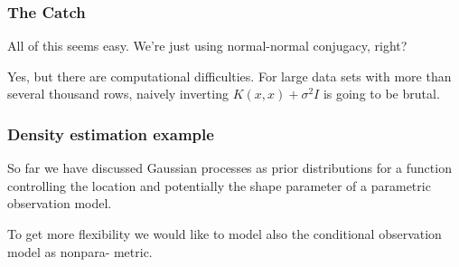 \documentclass{beamer}
\begin{document}
\begin{frame}
\frametitle{The Catch}

All of this seems easy. We're just using normal-normal conjugacy, right?
\newline
\pause

Yes, but there are computational difficulties. For large data sets with more than several thousand rows, naively inverting $K(x,x) + \sigma^2I$ is going to be brutal.

\end{frame}

\begin{frame}
\frametitle{Density estimation example}

So far we have discussed Gaussian processes as prior distributions for a function controlling
the location and potentially the shape parameter of a parametric observation model. 
\pause
\newline


To get more flexibility we would like to model also the conditional observation model as nonpara-
metric.

\end{frame}
\end{document}
